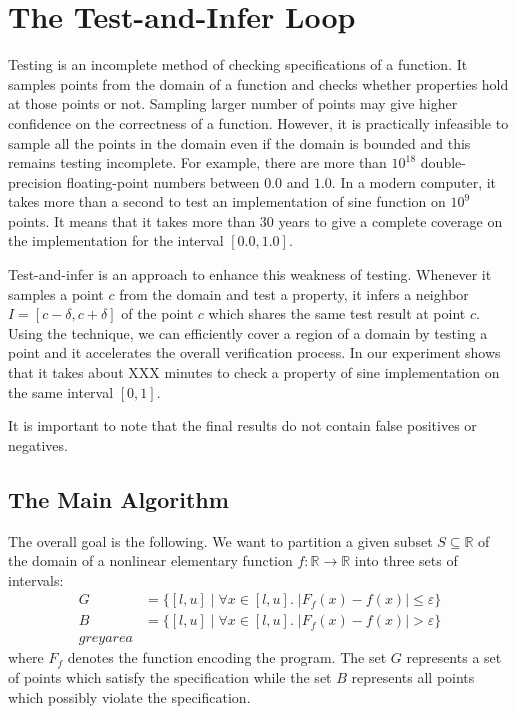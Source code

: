 \section{The Test-and-Infer Loop}

Testing is an incomplete method of checking specifications of a
function. It samples points from the domain of a function and checks
whether properties hold at those points or not. Sampling larger number
of points may give higher confidence on the correctness of a function.
However, it is practically infeasible to sample all the points in the
domain even if the domain is bounded and this remains testing
incomplete. For example, there are more than $10^{18}$ double-precision
floating-point numbers between $0.0$ and $1.0$. In a modern computer,
it takes more than a second to test an implementation of sine function
on $10^9$ points. It means that it takes more than 30 years to give a
complete coverage on the implementation for the interval $[0.0, 1.0]$.

Test-and-infer is an approach to enhance this weakness of testing.
Whenever it samples a point $c$ from the domain and test a property,
it infers a neighbor $I = [c - \delta, c + \delta]$ of the point $c$
which shares the same test result at point $c$. Using the technique,
we can efficiently cover a region of a domain by testing a point and
it accelerates the overall verification process. In our experiment
shows that it takes about XXX minutes to check a property of sine
implementation on the same interval $[0, 1]$.

It is important to note that the final results do not contain false positives or negatives. 



\subsection{The Main Algorithm}
The overall goal is the following. We want to partition a given subset $S \subseteq \mathbb{R}$ of the
domain of a nonlinear elementary function $f : \mathbb{R} \to
\mathbb{R}$ into three sets of intervals:
\begin{align*}
  G & = \{ [l, u] \mid \forall x \in [l, u]. \; | F_f(x) - f(x) | \le \varepsilon \}\\
  B & = \{ [l, u] \mid \forall x \in [l, u]. \; | F_f(x) - f(x) | > \varepsilon \}\\
  grey area &
\end{align*}
where $F_f$ denotes the function encoding the program. The set $G$
represents a set of points which satisfy the specification while the
set $B$ represents all points which possibly violate the
specification. 

